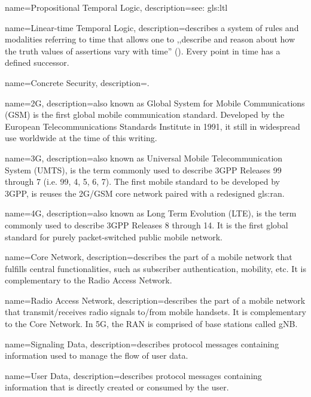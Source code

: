 {
    name={Propositional Temporal Logic},
    description={see: \gls{gls:ltl}}
}

{
    name={Linear-time Temporal Logic},
    description={describes a system of rules and modalities referring to time that allows one to ,,describe and reason about how the truth values of assertions vary
with time'' (\cite{emerson1990temporal}). Every point in time has a defined successor.}
}

{
    name={Concrete Security},
    description={.}
}

{
    name={2G},
    description={also known as Global System for Mobile Communications (GSM) is the first global mobile communication standard. Developed by the European Telecommunications Standards Institute in 1991, it still in widespread use worldwide at the time of this writing.}
}

{
    name={3G},
    description={also known as Universal Mobile Telecommunication System (UMTS), is the term commonly used to describe 3GPP Releases 99 through 7 (i.e. 99, 4, 5, 6, 7). The first mobile standard to be developed by 3GPP, is reuses the 2G/GSM core network paired with a redesigned \gls{gls:ran}.}
}

{
    name={4G},
    description={also known as Long Term Evolution (LTE), is the term commonly used to describe 3GPP Releases 8 through 14. It is the first global standard for purely packet-switched public mobile network.}
}

{
    name={Core Network},
    description={describes the part of a mobile network that fulfills central functionalities, such as subscriber authentication, mobility, etc. It is complementary to the Radio Access Network.}
}

{
    name={Radio Access Network},
    description={describes the part of a mobile network that transmit/receives radio signals to/from mobile handsets. It is complementary to the Core Network. In 5G, the RAN is comprised of base stations called gNB.}
}

{
    name={Signaling Data},
    description={describes protocol messages containing information used to manage the flow of user data.}
}

{
    name={User Data},
    description={describes protocol messages containing information that is directly created or consumed by the user.}
}